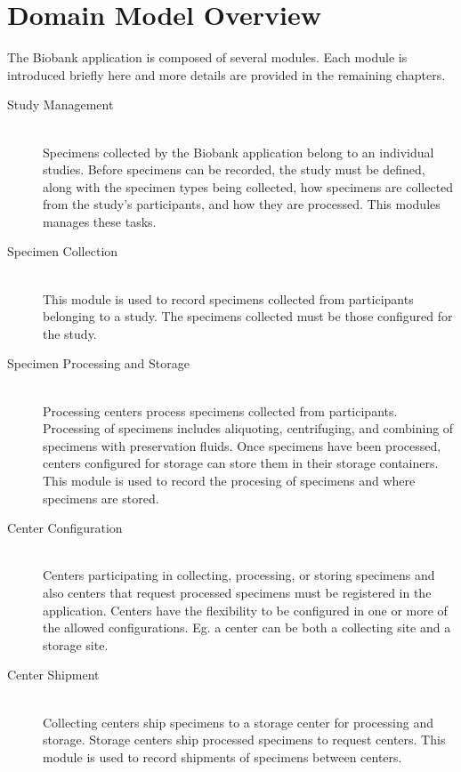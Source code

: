 \chapter{Domain Model Overview}

The Biobank application is composed of several modules. Each module is
introduced briefly here and more details are provided in the remaining
chapters.

\begin{description}

  \item[Study Management] \hfill \\ Specimens collected by the Biobank
    application belong to an individual studies. Before specimens can be
    recorded, the study must be defined, along with the specimen types being
    collected, how specimens are collected from the study's participants, and
    how they are processed. This modules manages these tasks.

  \item[Specimen Collection] \hfill \\ This module is used to record
    specimens collected from participants belonging to a study. The specimens
    collected must be those configured for the study.

  \item[Specimen Processing and Storage] \hfill \\ Processing centers process
    specimens collected from participants. Processing of specimens includes
    aliquoting, centrifuging, and combining of specimens with preservation
    fluids.  Once specimens have been processed, centers configured for storage
    can store them in their storage containers. This module is used to record
    the procesing of specimens and where specimens are stored.

  \item[Center Configuration] \hfill \\ Centers participating in collecting,
    processing, or storing specimens and also centers that request processed
    specimens must be registered in the application. Centers have the
    flexibility to be configured in one or more of the allowed
    configurations. Eg. a center can be both a collecting site and a storage
    site.

  \item[Center Shipment] \hfill \\ Collecting centers ship specimens to a
    storage center for processing and storage. Storage centers ship processed
    specimens to request centers. This module is used to record shipments of
    specimens between centers.


\end{description}
